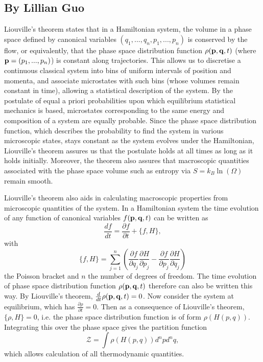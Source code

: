 \subsection{By Lillian Guo}

Liouville's theorem states that in a Hamiltonian system, the volume in a phase space defined by canonical variables $(q_1, ..., q_n, p_1, ..., p_n)$ is conserved by the flow, or equivalently, that the phase space distribution function $\rho({\bf p}, {\bf q}, t)$ (where ${\bf p} = (p_1, ..., p_n)$) is constant along trajectories. This allows us to discretise a continuous classical system into bins of uniform intervals of position and momenta, and associate microstates with such bins (whose volumes remain constant in time), allowing a statistical description of the system. By the postulate of equal a priori probabilities upon which equilibrium statistical mechanics is based, microstates corresponding to the same energy and composition of a system are equally probable. Since the phase space distribution function, which describes the probability to find the system in various microscopic states, stays constant as the system evolves under the Hamiltonian, Liouville's theorem assures us that the postulate holds at all times as long as it holds initially. Moreover, the theorem also assures that macroscopic quantities associated with the phase space volume such as entropy via $S = k_B \ln(\Omega)$ remain smooth.\par 

Liouville's theorem also aids in calculating macroscopic properties from microscopic quantities of the system. In a Hamiltonian system the time evolution of any function of canonical variables $f({\bf p}, {\bf q}, t)$ can be written as
\begin{equation}
\frac{df}{dt} = \frac{\partial f}{\partial t} + \{f, H\},
\end{equation}
with
\begin{equation}
\{f, H\} = \sum_{j=1}^n \left( \frac{\partial f}{\partial q_j} \frac{\partial H}{\partial p_j} - \frac{\partial f}{\partial p_j} \frac{\partial H}{\partial q_j}\right)
\end{equation}
the Poisson bracket and $n$ the number of degrees of freedom. The time evolution of phase space distribution function $\rho({\bf p}, {\bf q}, t)$ therefore can also be written this way. By Liouville's theorem, $\frac{d}{dt} \rho({\bf p}, {\bf q}, t) =0$. Now consider the system at equilibrium, which has $\frac{\partial \rho}{\partial t} = 0$. Then as a consequence of Liouville's theorem, $\{\rho, H\} = 0$, i.e. the phase space distribution function is of form $\rho(H(p, q))$. Integrating this over the phase space gives the partition function 
\begin{equation*}
\mathcal{Z} = \int  \rho(H(p, q))d^n p d^n q,
\end{equation*}
which allows calculation of all thermodynamic quantities.\par
